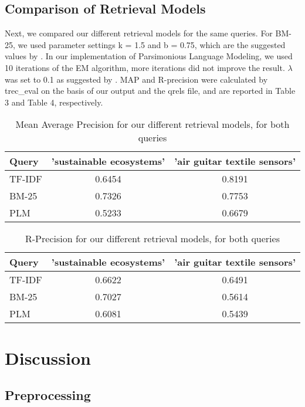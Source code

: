\documentclass{article}
\begin{document}
\subsection*{Comparison of Retrieval Models}

Next, we compared our different retrieval models for the same queries. For BM-25, we used parameter settings k = 1.5 and b = 0.75, which are the suggested values by \cite{robertson1995okapi}. In our implementation of Parsimonious Language Modeling, we used 10 iterations of the EM algorithm, more iterations did not improve the result. $\lambda$ was set to 0.1 as suggested by \cite{hiemstra2004parsimonious} . MAP and R-precision were calculated by trec\_eval on the basis of our output and the qrels file, and are reported in Table 3 and Table 4, respectively.

\begin{table}[h]
\caption{Mean Average Precision for our different retrieval models, for both queries}
\begin{tabular}{|l|c|c|}
\hline
Query & 'sustainable ecosystems' & 'air guitar textile sensors' \\ \hline
TF-IDF & 0.6454 & 0.8191 \\ \hline
BM-25 & 0.7326 & 0.7753 \\ \hline
PLM & 0.5233 & 0.6679 \\ \hline
\end{tabular}
\end{table}

\begin{table}[h]
\caption{R-Precision for our different retrieval models, for both queries}
\begin{tabular}{|l|c|c|}
\hline
Query & 'sustainable ecosystems' & 'air guitar textile sensors' \\ \hline
TF-IDF & 0.6622 & 0.6491 \\ \hline
BM-25 & 0.7027 & 0.5614 \\ \hline
PLM & 0.6081 & 0.5439 \\ \hline
\end{tabular}
\end{table}

\section*{Discussion}

\subsection*{Preprocessing}
\end{document}
